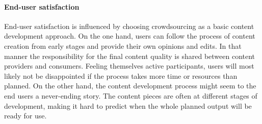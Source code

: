 \documentclass[PhD, Submit, ngerman,UKenglish,table]{scrbook}
\begin{document}
%
%

\paragraph{End-user satisfaction}

End-user satisfaction is influenced by choosing crowdsourcing as a basic content development approach.
On the one hand, users can follow the process of content creation from early stages and provide their own opinions and edits.
In that manner the responsibility for the final content quality is shared between content providers and consumers.
Feeling themselves active participants, users will most likely not be disappointed if the process takes more time or resources than planned.
On the other hand, the content development process might seem to the end users a never-ending story.
The content pieces are often at different stages of development, making it hard to predict when the whole planned output will be ready for use.

%
%
%
%
%
\end{document}
